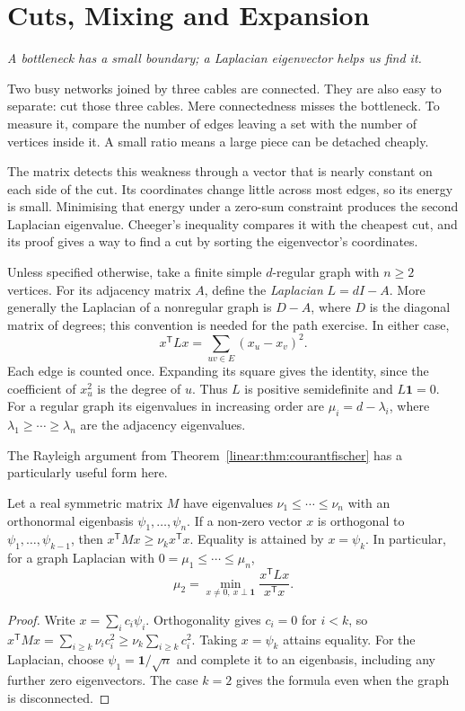 \chapter{Cuts, Mixing and Expansion}\label{ch:cheeger}
\begin{center}\itshape
A bottleneck has a small boundary; a Laplacian eigenvector helps us find it.
\end{center}

Two busy networks joined by three cables are connected. They are also easy to separate: cut those three cables. Mere connectedness misses the bottleneck. To measure it, compare the number of edges leaving a set with the number of vertices inside it. A small ratio means a large piece can be detached cheaply.

The matrix detects this weakness through a vector that is nearly constant on each side of the cut. Its coordinates change little across most edges, so its energy is small. Minimising that energy under a zero-sum constraint produces the second Laplacian eigenvalue. Cheeger's inequality compares it with the cheapest cut, and its proof gives a way to find a cut by sorting the eigenvector's coordinates.

Unless specified otherwise, take a finite simple $d$-regular graph with $n\ge2$ vertices. For its adjacency matrix $A$, define the \emph{Laplacian} $L=dI-A$. More generally the Laplacian of a nonregular graph is $D-A$, where $D$ is the diagonal matrix of degrees; this convention is needed for the path exercise. In either case,
\[
x^{\mathsf T}Lx=\sum_{uv\in E}(x_u-x_v)^2.
\]
Each edge is counted once. Expanding its square gives the identity, since the coefficient of $x_u^2$ is the degree of $u$. Thus $L$ is positive semidefinite and $L\mathbf1=0$. For a regular graph its eigenvalues in increasing order are $\mu_i=d-\lambda_i$, where $\lambda_1\ge\cdots\ge\lambda_n$ are the adjacency eigenvalues.

The Rayleigh argument from Theorem~\ref{linear:thm:courantfischer} has a particularly useful form here.

\begin{lemma}[Rayleigh]\label{expansion:lem:rayleigh}
Let a real symmetric matrix $M$ have eigenvalues $\nu_1\le\cdots\le\nu_n$ with an orthonormal eigenbasis $\psi_1,\ldots,\psi_n$. If a non-zero vector $x$ is orthogonal to $\psi_1,\ldots,\psi_{k-1}$, then
$x^{\mathsf T}Mx\ge\nu_kx^{\mathsf T}x$.
Equality is attained by $x=\psi_k$. In particular, for a graph Laplacian with $0=\mu_1\le\cdots\le\mu_n$,
\[
\mu_2=\min_{x\ne0,\ x\perp\mathbf1}\frac{x^{\mathsf T}Lx}{x^{\mathsf T}x}.
\]
\end{lemma}
\begin{proof}
Write $x=\sum_ic_i\psi_i$. Orthogonality gives $c_i=0$ for $i<k$, so
$x^{\mathsf T}Mx=\sum_{i\ge k}\nu_ic_i^2\ge\nu_k\sum_{i\ge k}c_i^2$.
Taking $x=\psi_k$ attains equality. For the Laplacian, choose $\psi_1=\mathbf1/\sqrt n$ and complete it to an eigenbasis, including any further zero eigenvectors. The case $k=2$ gives the formula even when the graph is disconnected.
\end{proof}


